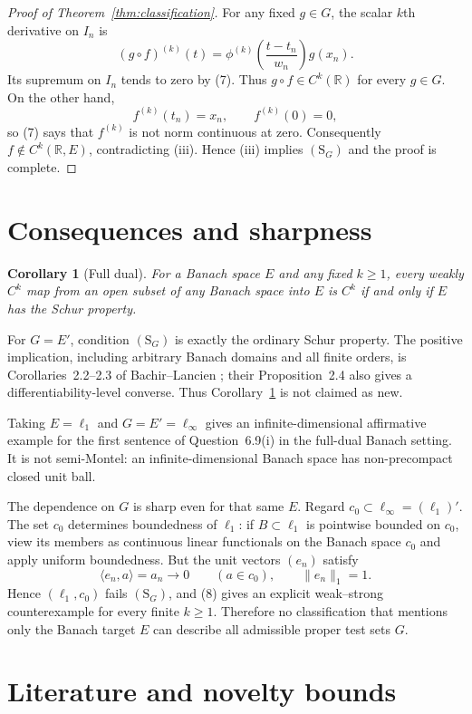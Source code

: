 \documentclass[11pt]{article}
\newtheorem{corollary}{Corollary}
\newcommand{\R}{\mathbb R}
\newcommand{\SG}{(\mathrm{S}_G)}
\begin{document}
\begin{proof}[Proof of Theorem~\ref{thm:classification}]
For any fixed $g\in G$, the scalar $k$th derivative on $I_n$ is
\[
 (g\circ f)^{(k)}(t)=
 \phi^{(k)}\!\left(\frac{t-t_n}{w_n}\right)g(x_n).
\]
Its supremum on $I_n$ tends to zero by (7).  Thus
$g\circ f\in C^k(\R)$ for every $g\in G$.  On the other hand,
\[
 f^{(k)}(t_n)=x_n,
 \qquad f^{(k)}(0)=0,
\]
so (7) says that $f^{(k)}$ is not norm continuous at zero.  Consequently
$f\notin C^k(\R,E)$, contradicting (iii).  Hence (iii) implies $\SG$ and the
proof is complete.
\end{proof}

\section{Consequences and sharpness}

\begin{corollary}[Full dual]\label{cor:full-dual}
For a Banach space $E$ and any fixed $k\geq1$, every weakly $C^k$ map from
an open subset of any Banach space into $E$ is $C^k$ if and only if $E$ has
the Schur property.
\end{corollary}

For $G=E'$, condition $\SG$ is exactly the ordinary Schur property.  The
positive implication, including arbitrary Banach domains and all finite
orders, is Corollaries~2.2--2.3 of Bachir--Lancien \cite{BachirLancien};
their Proposition~2.4 also gives a differentiability-level converse.  Thus
Corollary~\ref{cor:full-dual} is not claimed as new.

Taking $E=\ell_1$ and $G=E'=\ell_\infty$ gives an infinite-dimensional
affirmative example for the first sentence of Question~6.9(i) in the
full-dual Banach setting.  It is not semi-Montel: an infinite-dimensional
Banach space has non-precompact closed unit ball.

The dependence on $G$ is sharp even for that same $E$.  Regard
$c_0\subset\ell_\infty=(\ell_1)'$.  The set $c_0$ determines boundedness of
$\ell_1$: if $B\subset\ell_1$ is pointwise bounded on $c_0$, view its members
as continuous linear functionals on the Banach space $c_0$ and apply uniform
boundedness.  But the unit vectors $(e_n)$ satisfy
\[
 \langle e_n,a\rangle=a_n\longrightarrow0\qquad(a\in c_0),
 \qquad \|e_n\|_1=1.
\]
Hence $(\ell_1,c_0)$ fails $\SG$, and (8) gives an explicit weak--strong
counterexample for every finite $k\geq1$.  Therefore no classification that
mentions only the Banach target $E$ can describe all admissible proper test
sets $G$.

\section{Literature and novelty bounds}
\end{document}
